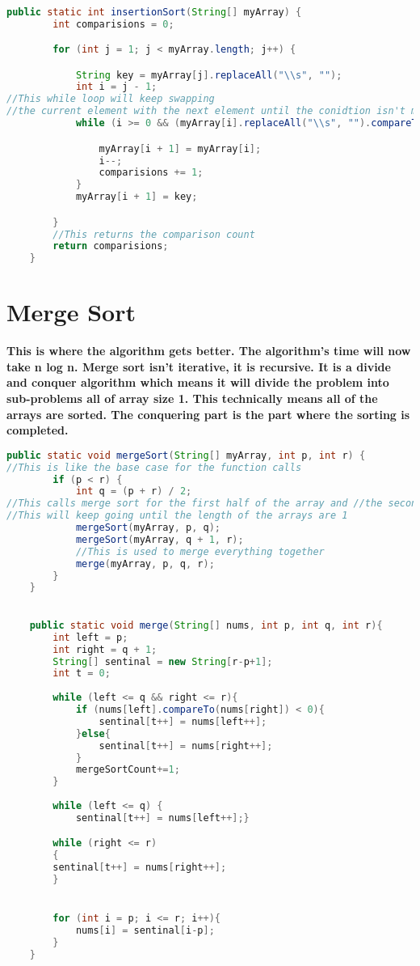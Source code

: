 \documentclass{article}
\begin{document}
\begin{lstlisting}[language = java]

public static int insertionSort(String[] myArray) {
        int comparisions = 0;

        for (int j = 1; j < myArray.length; j++) {

            String key = myArray[j].replaceAll("\\s", "");
            int i = j - 1;
//This while loop will keep swapping 
//the current element with the next element until the conidtion isn't met anymore
            while (i >= 0 && (myArray[i].replaceAll("\\s", "").compareTo(key) > 0)) {

                myArray[i + 1] = myArray[i];
                i--;
                comparisions += 1;
            }
            myArray[i + 1] = key;

        }
        //This returns the comparison count
        return comparisions;
    }
\end{lstlisting}
\section{Merge Sort}
\textbf{This is where the algorithm gets better. The algorithm's time will now take n log n. Merge sort isn't iterative, it is recursive. It is a divide and conquer algorithm which means it will divide the problem into sub-problems all of array size 1. This technically means all of the arrays are sorted. The conquering part is the part where the sorting is completed.}
\begin{lstlisting}[language = java]
public static void mergeSort(String[] myArray, int p, int r) {
//This is like the base case for the function calls
        if (p < r) {
            int q = (p + r) / 2;
//This calls merge sort for the first half of the array and //the second half of the array
//This will keep going until the length of the arrays are 1
            mergeSort(myArray, p, q);
            mergeSort(myArray, q + 1, r);
            //This is used to merge everything together
            merge(myArray, p, q, r);
        }
    }

    
    public static void merge(String[] nums, int p, int q, int r){
        int left = p;
        int right = q + 1;
        String[] sentinal = new String[r-p+1];
        int t = 0;
        
        while (left <= q && right <= r){
            if (nums[left].compareTo(nums[right]) < 0){
                sentinal[t++] = nums[left++];
            }else{
                sentinal[t++] = nums[right++];
            }
            mergeSortCount+=1;
        }
        
        while (left <= q) {
            sentinal[t++] = nums[left++];}

        while (right <= r)
        { 
        sentinal[t++] = nums[right++];
        }


        for (int i = p; i <= r; i++){
            nums[i] = sentinal[i-p];
        }
    }

    
\end{lstlisting}
\end{document}

